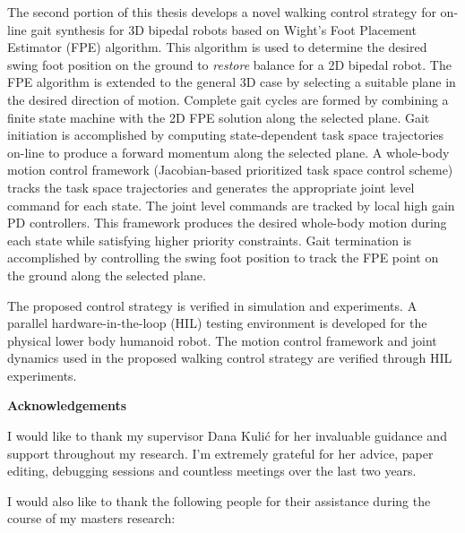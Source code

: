 The second portion of this thesis develops a novel walking control strategy for on-line gait synthesis for 3D bipedal robots based on Wight's Foot Placement Estimator (FPE) algorithm. This algorithm is used to determine the desired swing foot position on the ground to \emph{restore} balance for a 2D bipedal robot. The FPE algorithm is extended to the general 3D case by selecting a suitable plane in the desired direction of motion. Complete gait cycles are formed by combining a finite state machine with the 2D FPE solution along the selected plane. Gait initiation is accomplished by computing state-dependent task space trajectories on-line to produce a forward momentum along the selected plane. A whole-body motion control framework (Jacobian-based prioritized task space control scheme) tracks the task space trajectories and generates the appropriate joint level command for each state. The joint level commands are tracked by local high gain PD controllers. This framework produces the desired whole-body motion during each state while satisfying higher priority constraints. Gait termination is accomplished by controlling the swing foot position to track the FPE point on the ground along the selected plane. 

The proposed control strategy is verified in simulation and experiments. A parallel hardware-in-the-loop (HIL) testing environment is developed for the physical lower body humanoid robot. The motion control framework and joint dynamics used in the proposed walking control strategy are verified through HIL experiments.

\cleardoublepage


\begin{center}
    \textbf{Acknowledgements}
\end{center}

I would like to thank my supervisor Dana Kuli\'{c} for her invaluable guidance and support throughout my research. I'm extremely grateful for her advice, paper editing, debugging sessions and countless meetings over the last two years.  

I would also like to thank the following people for their assistance during the course of my masters research: 

